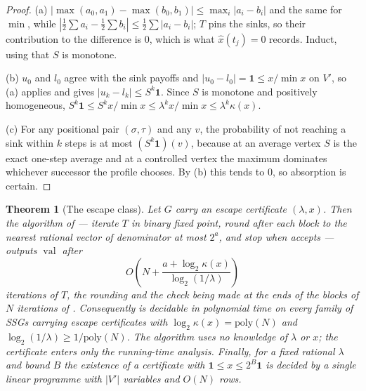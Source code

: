 \documentclass[11pt]{article}
\theoremstyle{plain}
\newtheorem{theorem}{Theorem}[section]
\theoremstyle{definition}
\DeclareMathOperator{\val}{val}
\newcommand{\bbone}{\mathbf{1}}
\begin{document}
\begin{proof}
(a) $|\max(a_0,a_1)-\max(b_0,b_1)|\le\max_i|a_i-b_i|$ and the same for
$\min$, while $|\tfrac12\sum a_i-\tfrac12\sum b_i|\le\tfrac12\sum|a_i-b_i|$;
$T$ pins the sinks, so their contribution to the difference is $0$, which
is what $\hat x(t_j)=0$ records. Induct, using that $S$ is monotone.

(b) $u_0$ and $l_0$ agree with the sink payoffs and
$|u_0-l_0|=\bbone\le x/\min x$ on $V'$, so (a) applies and gives
$|u_k-l_k|\le S^k\bbone$. Since $S$ is monotone and positively
homogeneous,
$S^k\bbone\le S^kx/\min x\le\lambda^kx/\min x\le\lambda^k\kappa(x)$.

(c) For any positional pair $(\sigma,\tau)$ and any $v$, the probability
of not reaching a sink within $k$ steps is at most $(S^k\bbone)(v)$,
because at an average vertex $S$ is the exact one-step average and at a
controlled vertex the maximum dominates whichever successor the profile
chooses. By (b) this tends to $0$, so absorption is certain.
\end{proof}

\begin{theorem}[The escape class]\label{thm:escape-class}
Let $G$ carry an escape certificate $(\lambda,x)$. Then the algorithm of
 --- iterate $T$ in binary fixed point, round after
each block to the nearest rational vector of denominator at most $2^{a}$,
and stop when  accepts --- outputs $\val$ after
\[
  O\!\left(N+\frac{a+\log_2\kappa(x)}{\log_2(1/\lambda)}\right)
\]
iterations of $T$, the rounding and the check being made at the ends of
the blocks of $N$ iterations of . Consequently  is decidable in
polynomial time on every family of SSGs carrying escape certificates with
$\log_2\kappa(x)=\mathrm{poly}(N)$ and $\log_2(1/\lambda)\ge1/\mathrm{poly}(N)$.
The algorithm uses no knowledge of $\lambda$ or $x$; the certificate
enters only the running-time analysis. Finally, for a fixed rational
$\lambda$ and bound $B$ the existence of a certificate with
$\bbone\le x\le2^{B}\bbone$ is decided by a single linear programme with
$|V'|$ variables and $O(N)$ rows.
\end{theorem}
\end{document}
